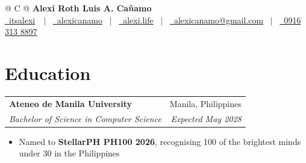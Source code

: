 \documentclass[a4paper, 11pt]{article}
\makeatletter
\newenvironment{highlights}{
    \begin{itemize}[
        topsep=0pt,
        parsep=0pt,
        partopsep=0pt,
        itemsep=0.3pt,
        leftmargin=1.15em
    ]
}{
    \end{itemize}
}
\newcommand{\entry}[4]{%
\begin{tabularx}{\linewidth}{@{}X r@{}}
\textbf{#1} & #2 \\[1pt]
\textit{#3} & \textit{#4} \\[1.5pt]
\end{tabularx}%
}
\makeatother
\begin{document}
\pagestyle{empty}
\setlength{\parskip}{0pt} 



\begin{tabularx}{\linewidth}{@{} C @{}}
\textbf{\fontsize{18 pt}{18 pt}\selectfont Alexi Roth Luis A. Cañamo} \\
\vspace{0.04 cm}
\href{https://github.com/itsalexi}{\color{black}\raisebox{-0.05\height}\faGithub\ itsalexi}\ \ $|$ \ 
\href{https://linkedin.com/in/alexicanamo}{\color{black}\raisebox{-0.05\height}\faLinkedin\ alexicanamo} \ $|$ \ 
\href{https://alexi.life}{\color{black}\raisebox{-0.05\height}\faGlobe\ alexi.life} \ $|$ \ 
\href{mailto:alexicanamo@gmail.com}{\color{black}\raisebox{-0.05\height}\faEnvelope\ alexicanamo@gmail.com} \ $|$ \ 
\href{tel:+639163138897}{\color{black}\raisebox{-0.05\height}\faMobile\ 0916 313 8897} \\
\end{tabularx}

\section{Education}

\entry{Ateneo de Manila University}{Manila, Philippines}{Bachelor of Science in Computer Science}{Expected May 2028}
\begin{highlights}
    \item Named to \textbf{StellarPH PH100 2026}, recognising 100 of the brightest minds under 30 in the Philippines
\end{highlights}

\end{document}
